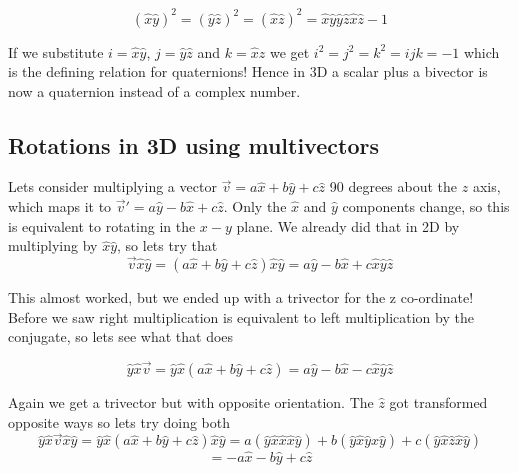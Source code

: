 \documentclass[options]{report}
\def \v{\vec{v}}
\def \xhat{\hat{x}}
\def \yhat{\hat{y}}
\def \zhat{\hat{z}}
\begin{document}
\begin{equation*}
	(\xhat \yhat)^2 = (\yhat \zhat)^2 = (\xhat \zhat)^2 = \xhat \yhat \yhat \zhat \xhat \zhat -1
\end{equation*}

If we substitute $i = \xhat \yhat$, $j = \yhat \zhat$ and $k = \xhat \zhat$ we get $i^2=j^2=k^2=ijk=-1$ which is the defining relation for quaternions! Hence in 3D a scalar plus a bivector is now a quaternion instead of a complex number.

\subsection{Rotations in 3D using multivectors}
Lets consider multiplying a vector $\v = a\xhat + b\yhat + c\zhat$ 90 degrees about the $z$ axis, which maps it to $\v' = a\yhat - b\xhat + c \zhat$. Only the $\xhat$ and $\yhat$ components change, so this is equivalent to rotating in the $x-y$ plane. We already did that in 2D by multiplying by $\xhat \yhat$, so lets try that
\begin{equation*}
	\v \xhat \yhat = (a\xhat + b\yhat + c\zhat) \xhat \yhat = a \yhat - b \xhat + c \xhat \yhat \zhat
\end{equation*}

This almost worked, but we ended up with a trivector for the z co-ordinate! Before we saw right multiplication is equivalent to left multiplication by the conjugate, so lets see what that does

\begin{equation*}
	\yhat \xhat \v =  \yhat \xhat (a\xhat + b\yhat + c\zhat) = a \yhat - b \xhat - c \xhat \yhat \zhat
\end{equation*}

Again we get a trivector but with opposite orientation. The $\zhat$ got transformed opposite ways so lets try doing both
\begin{equation*}
	\yhat \xhat \v \xhat \yhat = \yhat \xhat (a\xhat + b\yhat + c\zhat) \xhat \yhat = a (\yhat \xhat \xhat \xhat \yhat) + b (\yhat \xhat \yhat \xhat \yhat) + c (\yhat \xhat \zhat \xhat \yhat)
\end{equation*}
\begin{equation*}
	= -a \xhat -b \yhat + c\zhat
\end{equation*}
\end{document}
